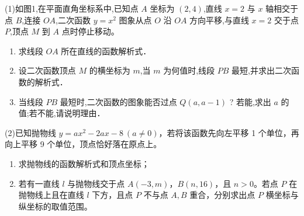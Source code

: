 \begin{exercise}
    \small
    \setlength{\parindent}{0pt} %
    \setlength{\columnseprule}{0.01pt}
    \begin{multicols}{2}
    (1)如图1,在平面直角坐标系中,已知点 \( A \) 坐标为 \((2,4)\),直线 \( x=2 \) 与 \( x \) 轴相交于点 \( B \),连接 \( OA \),二次函数 \( y=x^2 \) 图象从点 \( O \) 沿 \( OA \) 方向平移,与直线 \( x=2 \) 交于点 \( P \),顶点 \( M \) 到 \( A \) 点时停止移动。
        
    \begin{enumerate}
        \item 求线段 \( OA \) 所在直线的函数解析式．
        \item 设二次函数顶点 \( M \) 的横坐标为 \( m \),当 \( m \) 为何值时,线段 \( PB \) 最短,并求出二次函数的解析式．
        \item 当线段 \( PB \) 最短时,二次函数的图象能否过点 \( Q(a,a-1) \) ? 若能,求出 \( a \) 的值;若不能,请说明理由．
    \end{enumerate}




    (2)已知抛物线 \( y = ax^2 - 2ax - 8 \ (a \neq 0) \)，若将该函数先向左平移 1 个单位，再向上平移 9 个单位，顶点恰好落在原点上。

    \begin{enumerate}
        \item 求抛物线的函数解析式和顶点坐标；
        \item 若有一直线 \( l \) 与抛物线交于点 \( A(-3, m) \)，\( B(n, 16) \)，且 \( n > 0 \)。若点 \( P \) 在抛物线上且在直线 \( l \) 下方，且点 \( P \) 不与点 \( A, B \) 重合，分别求出点 \( P \) 横坐标与纵坐标的取值范围。
    \end{enumerate}
    
    \end{multicols}


\end{exercise}
